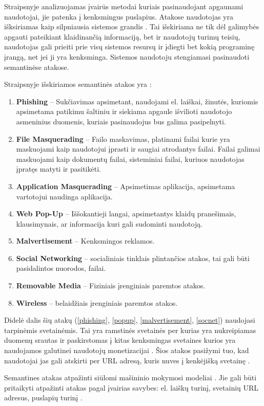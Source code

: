 Straipsnyje  analizuojamas įvairūs metodai kuriais pasinaudojant apgaunami naudotojai, jie patenka į kenksmingus puslapius. Atakose naudotojas yra išksiriamas kaip silpniausia sistemos grandis \cite{tax}. Tai išskiriama ne tik dėl galimybės apgauti pateikiant klaidinančią informaciją, bet ir naudotojų turimų teisių, naudotojas gali prieiti prie visų sistemos resursų ir įdiegti bet kokią programinę įrangą, net jei ji yra kenksminga. Sistemos naudotoju stengiamasi pasinaudoti semantinėse atakose.

Straipsnyje išskiriamos semantinės atakos yra \cite{tax}:
\begin{enumerate}
    \item \label{phishing} \textbf{Phishing} -- Sukčiavimas apsimetant, naudojami el. laiškai, žinutės, kuriomis apsimetama patikimu šaltiniu ir siekiama apgaule išvilioti naudotojo asmeninius duomenis, kuriais pasinaudojus bus galima pasipelnyti.
    \item \textbf{File Masquerading} -- Failo maskavimas, platinami failai kurie yra maskuojami kaip naudotojui įprasti ir saugiai atrodantys failai. Failai galimai maskuojami kaip dokumentų failai, sisteminiai failai, kuriuos naudotojas įpratęs matyti ir pasitikėti.
    \item \textbf{Application Masquerading} -- Apsimetimas aplikacija, apsimetama vartotojui naudinga aplikacija.
    \item \label{popup} \textbf{Web Pop-Up} -- Iššokantieji langai, apsimetantys klaidų pranešimais, klausimynais, ar informacija kuri gali sudominti naudotoją.
    \item \label{malvertisement}\textbf{Malvertisement} -- Kenksmingos reklamos.
    \item \label{socnet}\textbf{Social Networking} -- socialiniais tinklais plintančios atakos, tai gali būti pasidalintos nuorodos, failai.
    \item \textbf{Removable Media} -- Fiziniais įrenginiais paremtos atakos.
    \item \textbf{Wireless} -- belaidžiais įrenginiais paremtos atakos.
\end{enumerate}
Didelė dalis šių atakų (\ref{phishing}, \ref{popup}, \ref{malvertisement}, \ref{socnet}) naudojasi tarpinėmis svetainėmis. Tai yra ramstinės svetainės per kurias yra nukreipiamas duomenų srautas ir paskirstomas į kitas kenksmingas svetaines kurios yra naudojamos galutinei naudotojų monetizacijai \cite{linchpins}. Šios atakos pasižymi tuo, kad naudotojai jas gali atskirti per URL adresą, kuris nuves į kenkėjišką svetainę \cite{tax}.

Semantines atakas atpažinti siūlomi mašininio mokymosi modeliai \cite{tax}. Jie gali būti pritaikyti atpažinti atakas pagal įvairias savybes: el. laiškų turinį, svetainių URL adresus, puslapių turinį \cite{tax}.